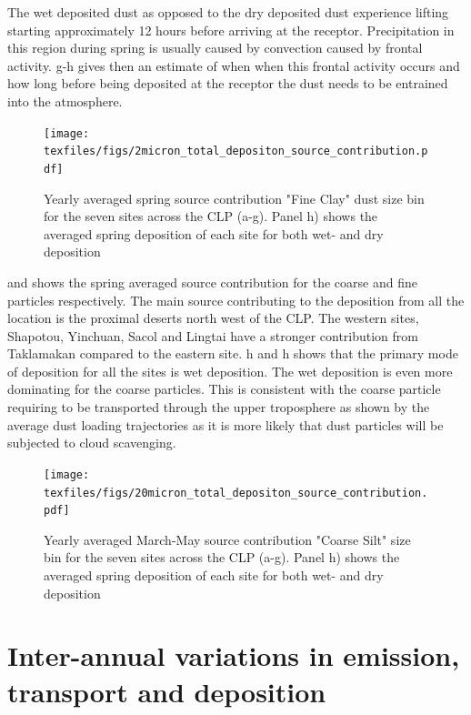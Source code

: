 The wet deposited dust as opposed to the dry deposited dust experience lifting starting approximately 12 hours before arriving at the receptor. Precipitation in this region during spring is usually caused by convection caused by frontal activity. g-h gives then an estimate of when when this frontal activity occurs and how long before being deposited at the receptor the dust needs to be entrained into the atmosphere.       
\begin{figure}[htbp]
    \centering
    \texttt{[image: texfiles/figs/2micron\_total\_depositon\_source\_contribution.pdf]}
    \caption{Yearly averaged spring source contribution "Fine Clay" dust size bin for the seven sites across the CLP (a-g). Panel h) shows the averaged spring deposition of each site for both wet- and dry deposition}
    \label{fig:source_contrib_2mmu}
\end{figure}

 and  shows the spring averaged source contribution for the coarse and fine particles respectively. The main source contributing to the deposition from all the location is the proximal deserts north west of the CLP.  The western sites, Shapotou, Yinchuan, Sacol and Lingtai have a stronger contribution from Taklamakan compared to the eastern site. h and h shows that the primary mode of deposition for all the sites is wet deposition. The wet deposition is even more dominating for the coarse particles. This is consistent with the coarse particle requiring to be transported through the upper troposphere as shown by the average dust loading trajectories as it is more likely that dust particles will be subjected to cloud scavenging.     
 \begin{figure}[htbp]
    \centering
    \texttt{[image: texfiles/figs/20micron\_total\_depositon\_source\_contribution.pdf]}
    \caption{Yearly averaged March-May source contribution "Coarse Silt" size bin for the seven sites across the CLP (a-g). Panel h) shows the averaged spring deposition of each site for both wet- and dry deposition}
    \label{fig:source_contrib_20mmu}
\end{figure}

\section{Inter-annual variations in emission, transport and deposition}

